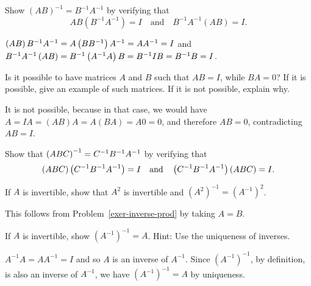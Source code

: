 \begin{enumialphparenastyle}
\begin{ex}\label{exer-inverse-prod}
  Show $(AB)^{-1}=B^{-1}A^{-1}$ by verifying that
  \begin{equation*}
    AB(B^{-1}A^{-1}) = I
    \quad\mbox{and}\quad
    B^{-1}A^{-1}(AB) = I.
  \end{equation*}
  \vspace{-4ex}
  \begin{sol}
    $\left(AB\right)
    B^{-1}A^{-1}=A\left(BB^{-1}\right) A^{-1}=AA^{-1}=I$ and  $B^{-1}A^{-1}\left(
      AB\right) =B^{-1}\left(A^{-1}A\right) B=B^{-1}IB=B^{-1}B=I$.
  \end{sol}
\end{ex}

\begin{ex}
  Is it possible to have matrices $A$ and $B$ such that $AB=I$, while
  $BA=0$? If it is possible, give an example of such matrices. If it
  is not possible, explain why.
  \begin{sol}
    It is not possible, because in that case, we would have
    $A=IA=(AB)A=A(BA)=A0=0$, and therefore $AB=0$, contradicting $AB=I$.
  \end{sol}
\end{ex}

\begin{ex}
  Show that $\left(ABC\right) ^{-1}=C^{-1}B^{-1}A^{-1}$ by verifying that
  \begin{equation*}
    \left(ABC\right) \left(C^{-1}B^{-1}A^{-1}\right) = I
    \quad\mbox{and}\quad
    \left(C^{-1}B^{-1}A^{-1}\right)\left(ABC\right) = I.
  \end{equation*} 
\end{ex}

\begin{ex}
  If $A$ is invertible, show that $A^2$ is invertible and
  $(A^{2})^{-1}=(A^{-1})^{2}$.
  \begin{sol}
    This follows from Problem~\ref{exer-inverse-prod} by taking $A=B$.
  \end{sol}
\end{ex}

\begin{ex}If $A$ is invertible, show $(A^{-1})^{-1}=A$.
  Hint: Use the uniqueness of inverses. 
  \begin{sol}
    $A^{-1}A=AA^{-1}=I$ and so $A$ is an inverse of $A^{-1}$. Since
    $(A^{-1})^{-1}$, by definition, is also an inverse of $A^{-1}$, we
    have $(A^{-1})^{-1}=A$ by uniqueness.
  \end{sol}
\end{ex}

\end{enumialphparenastyle}
